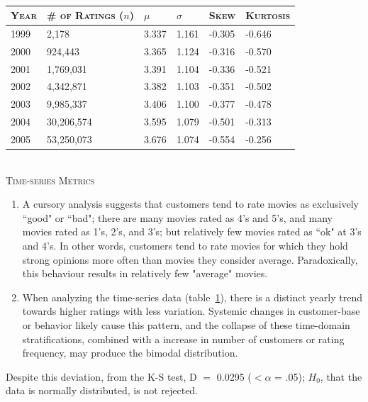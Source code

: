 \documentclass[prodmode,acmtecs]{acmsmall}
\begin{document}
\begin{table}
\begin{center}
    \begin{tabular}{ | l | l | l |  l | l |  l  |}
    \hline
    \textsc{Year} & \textsc{\# of Ratings ($n$)} & $\mu$ & $\sigma$ & \textsc{Skew} &  \textsc{Kurtosis} \\ \hline
    1999 & 2,178         & 3.337 & 1.161 & -0.305 & -0.646 \\ \hline
    2000 & 924,443     & 3.365 & 1.124 & -0.316 & -0.570 \\ \hline
    2001 & 1,769,031  & 3.391 & 1.104 & -0.336 & -0.521 \\ \hline
    2002 & 4,342,871  & 3.382 & 1.103 & -0.351 & -0.502 \\ \hline
    2003 & 9,985,337  & 3.406 & 1.100 & -0.377 & -0.478 \\ \hline
    2004 & 30,206,574& 3.595 & 1.079 & -0.501 & -0.313 \\ \hline
    2005 & 53,250,073& 3.676 & 1.074 & -0.554 & -0.256  \\ \hline
    \end{tabular}
\\
\textsc{Time-series Metrics}
\end{center}
\caption{}
\label{table:two}
\end{table}

\begin{enumerate}
	\item A cursory analysis suggests that customers tend to rate movies as exclusively ``good" or ``bad"; there are many movies rated as 4's and 5's, and many movies rated as 1's, 2's, and 3's; but relatively few movies rated as ``ok" at 3's and 4's. In other words, customers tend to rate movies for which they hold strong opinions more often than movies they consider average. Paradoxically, this behaviour results in relatively few "average" movies.
	\item When analyzing the time-series data (table~\ref{table:two}), there is a distinct yearly trend towards higher ratings with less variation. Systemic changes in customer-base or behavior likely cause this pattern, and the collapse of these time-domain stratifications, combined with a increase in number of customers or rating frequency, may produce the bimodal distribution.
\end{enumerate}
Despite this deviation, from the K-S test, D $=$ 0.0295 ($<\alpha$ = .05); $H_0$, that the data is normally distributed, is not rejected.
\end{document}
